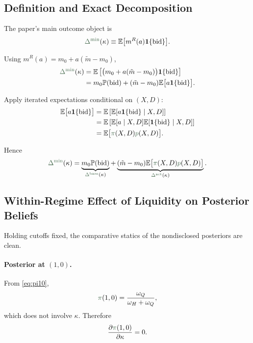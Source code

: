 \documentclass[11pt,a4paper]{article}
\theoremstyle{definition}
\theoremstyle{plain}
\theoremstyle{remark}
\newcommand{\E}{\mathbb{E}}
\newcommand{\PP}{\mathbb{P}}
\newcommand{\1}{\mathbf{1}}
\newcommand{\outcome}[1]{{\color{ForestGreen!50!black}#1}}
\begin{document}
\subsection{Definition and Exact Decomposition}

The paper's main outcome object is
\begin{equation}
\outcome{\Delta^{\min}}(\kappa)
\equiv
\E\big[m^R(a)\1\{\text{bid}\}\big].
\label{eq:deltamin}
\end{equation}

Using $m^R(a)=m_0 + a(\tilde m-m_0)$,
\begin{align}
\outcome{\Delta^{\min}}(\kappa)
&=
\E\left[\big(m_0 + a(\tilde m-m_0)\big)\1\{\text{bid}\}\right]
\nonumber\\
&=
m_0 \PP(\text{bid}) + (\tilde m-m_0)\E\big[a\1\{\text{bid}\}\big].
\label{eq:deltamin-step1}
\end{align}

Apply iterated expectations conditional on $(X,D)$:
\begin{align}
\E\big[a\1\{\text{bid}\}\big]
&=
\E\left[\E[a\1\{\text{bid}\}\mid X,D]\right]
\nonumber\\
&=
\E\left[\E[a\mid X,D]\E[\1\{\text{bid}\}\mid X,D]\right]
\nonumber\\
&=
\E\big[\outcome{\pi}(X,D)\outcome{p}(X,D)\big].
\label{eq:deltamin-step2}
\end{align}

Hence
\begin{equation}
\outcome{\Delta^{\min}}(\kappa)
=
\underbrace{m_0\PP(\text{bid})}_{\outcome{\Delta^{\textup{base}}}(\kappa)}
+
\underbrace{(\tilde m-m_0)\E\big[\outcome{\pi}(X,D)\outcome{p}(X,D)\big]}_{\outcome{\Delta^{\textup{act}}}(\kappa)}.
\label{eq:deltamin-decomp}
\end{equation}

\subsection{Within-Regime Effect of Liquidity on Posterior Beliefs}

Holding cutoffs fixed, the comparative statics of the nondisclosed posteriors are clean.

\paragraph{Posterior at $(1,0)$.}
From \eqref{eq:pi10},
\begin{equation}
\outcome{\pi}(1,0)=\frac{\omega_Q}{\omega_H+\omega_Q},
\label{eq:pi10-repeat}
\end{equation}
which does not involve $\kappa$. Therefore
\begin{equation}
\frac{\partial \outcome{\pi}(1,0)}{\partial \kappa}=0.
\label{eq:pi10-deriv}
\end{equation}
\end{document}
